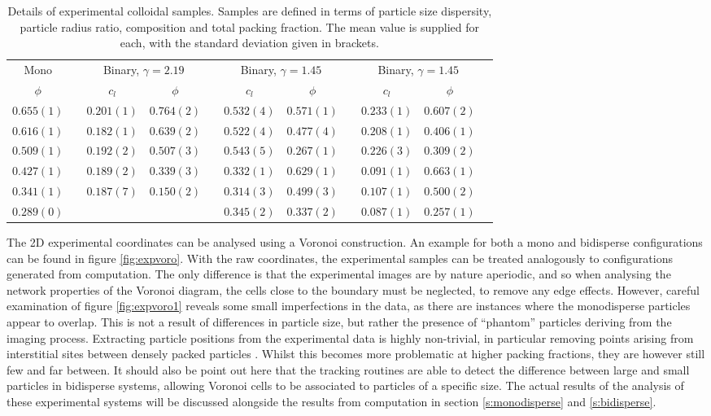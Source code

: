 \begin{table}
\centering
\caption{Details of experimental colloidal samples. Samples are defined in terms of particle size dispersity, particle radius ratio, composition and total packing fraction. The mean value is supplied for each, with the standard deviation given in brackets.}
\label{tab:expcolloid}
\begin{tabular}{@{}ccccccccccc@{}}
\toprule
\multicolumn{1}{c}{Mono} & \phantom{x} & \multicolumn{2}{c}{Binary, $\gamma=2.19$} & \phantom{x} & \multicolumn{2}{c}{Binary, $\gamma=1.45$} & \phantom{x} & \multicolumn{2}{c}{Binary, $\gamma=1.45$}\\ 
\cmidrule{1-1} \cmidrule{3-4} \cmidrule{6-7} \cmidrule{9-10}
$\phi$ & & $c_l$ & $\phi$ &  & $c_l$ & $\phi$ & & $c_l$ & $\phi$  \\ 
\midrule
$0.655(1)$&&$0.201(1)$&$0.764(2)$&&$0.532(4)$&$0.571(1)$&&$0.233(1)$&$0.607(2)$\\
$0.616(1)$&&$0.182(1)$&$0.639(2)$&&$0.522(4)$&$0.477(4)$&&$0.208(1)$&$0.406(1)$\\
$0.509(1)$&&$0.192(2)$&$0.507(3)$&&$0.543(5)$&$0.267(1)$&&$0.226(3)$&$0.309(2)$\\
$0.427(1)$&&$0.189(2)$&$0.339(3)$&&$0.332(1)$&$0.629(1)$&&$0.091(1)$&$0.663(1)$\\
$0.341(1)$&&$0.187(7)$&$0.150(2)$&&$0.314(3)$&$0.499(3)$&&$0.107(1)$&$0.500(2)$\\
$0.289(0)$&& &&&$0.345(2)$&$0.337(2)$&&$0.087(1)$&$0.257(1)$\\
\bottomrule
\end{tabular}
\end{table}

The 2D experimental coordinates can be analysed using a Voronoi construction. An example for both a mono and bidisperse configurations can be found in figure \ref{fig:expvoro}.
With the raw coordinates, the experimental samples can be treated analogously to configurations generated from computation.
The only difference is that the experimental images are by nature aperiodic, and so when analysing the network properties of the Voronoi diagram, the cells close to the boundary must be neglected, to remove any edge effects. 
However, careful examination of figure \ref{fig:expvoro1} reveals some small imperfections in the data, as there are instances where the monodisperse particles appear to overlap.
This is not a result of differences in particle size, but rather the presence of ``phantom'' particles deriving from the imaging process.
Extracting particle positions from the experimental data is highly non\--trivial, in particular removing points arising from interstitial sites between densely packed particles \cite{alice2015a}.
Whilst this becomes more problematic at higher packing fractions, they are however still few and far between.
It should also be point out here that the tracking routines are able to detect the difference between large and small particles in bidisperse systems, allowing Voronoi cells to be associated to particles of a specific size.
The actual results of the analysis of these experimental systems will be discussed alongside the results from computation in section \ref{s:monodisperse} and \ref{s:bidisperse}.

